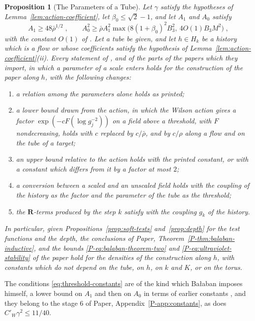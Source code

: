 \documentclass[11pt]{preprint}
\numberwithin{equation}{section}
\newtheorem{proposition}{Proposition}
\theoremstyle{definition}
\theoremstyle{remark}
\theoremstyle{plain}
\begin{document}
\begin{proposition}[The Parameters of a Tube]\label{prop:parameters}
Let $\gamma$ satisfy the hypotheses of Lemma~\ref{lem:action-coefficient}, let $\beta_0 \leq \sqrt2 - 1$, and let $A_1$ and $A_0$ satisfy
\begin{equation}\label{eq:threshold-constants}
    A_1 \geq 48\bar\rho^{1/2}\;,
    \qquad
    A_0^2 \geq \bar\rho A_1^2\max\bigl(8(1 + \beta_0)^2B_3^2,\ 4O(1)B_3M^2\bigr)\;,
\end{equation}
with the constant $O(1)$ of \cite[p.~381]{BalabanLFR2}. Let a tube be given, and let $h \in H_k$ be a history which is a flow or whose coefficients satisfy the hypothesis of Lemma~\ref{lem:action-coefficient}(ii). Every statement of \cite{BalabanCRE,BalabanLFR1,BalabanLFR2}, and of the parts of the papers which they import, in which a parameter of a scale enters holds for the construction of the paper along $h$, with the following changes:
\begin{enumerate}[label=(\alph*)]
\item a relation among the parameters alone holds as printed;
\item a lower bound drawn from the action, in which the Wilson action gives a factor $\exp(-cF(\log g_j^{-2}))$ on a field above a threshold, with $F$ nondecreasing, holds with $c$ replaced by $c/\bar\rho$, and by $c/\rho$ along a flow and on the tube of a target;
\item an upper bound relative to the action holds with the printed constant, or with a constant which differs from it by a factor at most $2$;
\item a conversion between a scaled and an unscaled field holds with the coupling of the history as the factor and the parameter of the tube as the threshold;
\item the $\mathbf R$-terms produced by the step $k$ satisfy \cite[(2.31), p.~260]{BalabanCRE} with the coupling $g_k$ of the history.
\end{enumerate}
In particular, given Propositions~\ref{prop:soft-tests} and~\ref{prop:depth} for the test functions and the depth, the conclusions of Paper, Theorem~\ref{P-thm:balaban-inductive}, and the bounds \eqref{P-eq:balaban-theorem-two} and \eqref{P-eq:ultraviolet-stability} of the paper hold for the densities of the construction along $h$, with constants which do not depend on the tube, on $h$, on $k$ and $K$, or on the torus.
\end{proposition}

The conditions \eqref{eq:threshold-constants} are of the kind which Ba{\l}aban imposes himself, a lower bound on $A_1$ and then on $A_0$ in terms of earlier constants \cite[p.~246, p.~265]{BalabanCRE}, and they belong to the stage $6$ of Paper, Appendix~\ref{P-app:constants}, as does $C'_W\gamma^2 \leq 11/40$.
\end{document}
